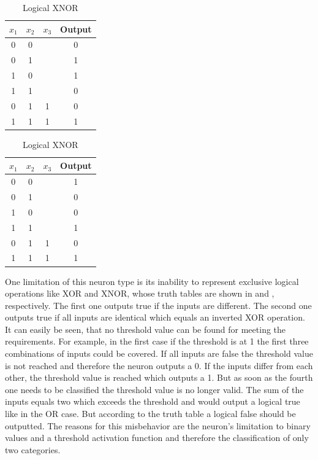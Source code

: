 \begin{table}[]
	\begin{subtable}{.5\textwidth}
		\centering
		\caption{Logical XOR}
		\label{tab:logical-xor}
		\begin{tabular}{ccc|c}
			\hline
			$x_1$ & $x_2$ & $x_3$ & Output 				\\ \hline
			0           & 0           &        & 0      \\
			0           & 1           &        & 1      \\
			1           & 0           &        & 1      \\
			1           & 1           &        & 0      \\ \hline
			0           & 1           & 1      & 0      \\
			1           & 1           & 1      & 1     
		\end{tabular}
	\end{subtable}%
	\begin{subtable}{.5\textwidth}
		\centering
		\caption{Logical XNOR}
		\label{tab:logical-xnor}
		\begin{tabular}{ccc|c}
			\hline
			$x_1$ & $x_2$ & $x_3$ & Output \\ \hline
			0           & 0           &             & 1      \\
			0           & 1           &             & 0      \\
			1           & 0           &             & 0      \\
			1           & 1           &             & 1      \\ \hline
			0           & 1           & 1           & 0      \\
			1           & 1           & 1           & 1     
		\end{tabular}
	\end{subtable}
\end{table}
One limitation of this neuron type is its inability to represent exclusive logical operations like XOR and XNOR\cite{Minsky69}, whose truth tables are shown in  and , respectively.
The first one outputs true if the inputs are different.
The second one outputs true if all inputs are identical which equals an inverted XOR operation.
It can easily be seen, that no threshold value can be found for meeting the requirements.
For example, in the first case if the threshold is at 1 the first three combinations of inputs could be covered.
If all inputs are false the threshold value is not reached and therefore the neuron outputs a 0.
If the inputs differ from each other, the threshold value is reached which outputs a 1.
But as soon as the fourth one needs to be classified the threshold value is no longer valid.
The sum of the inputs equals two which exceeds the threshold and would output a logical true like in the OR case.
But according to the truth table a logical false should be outputted.
The reasons for this misbehavior are the neuron's limitation to binary values and a threshold activation function and therefore the classification of only two categories.

